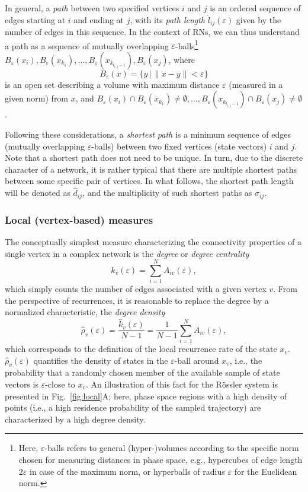 \documentclass[graybox]{svmult}
\begin{document}
In general, a \emph{path} between two specified vertices $i$ and $j$ is an ordered sequence of edges starting at $i$ and ending at $j$, with its \emph{path length} $\hat{l}_{ij}(\varepsilon)$ given by the number of edges in this sequence. In the context of RNs, we can thus understand a path as a sequence of mutually overlapping $\varepsilon$-balls\footnote{Here, $\varepsilon$-balls refers to general (hyper-)volumes according to the specific norm chosen for measuring distances in phase space, e.g., hypercubes of edge length $2\varepsilon$ in case of the maximum norm, or hyperballs of radius $\varepsilon$ for the Euclidean norm.} $B_{\varepsilon}(x_i),B_{\varepsilon}(x_{k_1}),\dots,B_{\varepsilon}(x_{k_{l_{i,j}-1}}),B_{\varepsilon}(x_j)$, where $$B_{\varepsilon}(x)=\{y\,|\,\|x-y\|<\varepsilon\}$$ is an open set describing a volume with maximum distance $\varepsilon$ (measured in a given norm) from $x$, and $B_{\varepsilon}(x_i)\cap B_{\varepsilon}(x_{k_1})\neq\emptyset,\dots,B_{\varepsilon}(x_{k_{l_{i,j}-1}})\cap B_{\varepsilon}(x_j)\neq\emptyset$.

Following these considerations, a \emph{shortest path} is a minimum sequence of edges (mutually overlapping $\varepsilon$-balls) between two fixed vertices (state vectors) $i$ and $j$. Note that a shortest path does not need to be unique. In turn, due to the discrete character of a network, it is rather typical that there are multiple shortest paths between some specific pair of vertices. In what follows, the shortest path length will be denoted as $\hat{d}_{ij}$, and the multiplicity of such shortest paths as $\hat{\sigma}_{ij}$.


\subsubsection{Local (vertex-based) measures}

The conceptually simplest measure characterizing the connectivity properties of a single vertex in a complex network is the \textit{degree} or \textit{degree centrality}
\begin{equation}
\hat{k}_v(\varepsilon)=\sum_{i=1}^N A_{iv}(\varepsilon),
\label{eq:degree}
\end{equation}
\noindent
which simply counts the number of edges associated with a given vertex $v$. From the perspective of recurrences, it is reasonable to replace the degree by a normalized characteristic, the \textit{degree density}
\begin{equation}
\hat{\rho}_v(\varepsilon)=\frac{\hat{k}_v(\varepsilon)}{N-1}=\frac{1}{N-1} \sum_{i=1}^N A_{iv}(\varepsilon),
\label{eq:locrho}
\end{equation}
\noindent
which corresponds to the definition of the local recurrence rate of the state $x_v$. $\hat{\rho}_v(\varepsilon)$ quantifies the density of states in the $\varepsilon$-ball around $x_v$, i.e., the probability that a randomly chosen member of the available sample of state vectors is $\varepsilon$-close to $x_v$. An illustration of this fact for the R\"ossler system is presented in Fig.~\ref{fig:local}A; here, phase space regions with a high density of points (i.e., a high residence probability of the sampled trajectory) are characterized by a high degree density.
\end{document}
